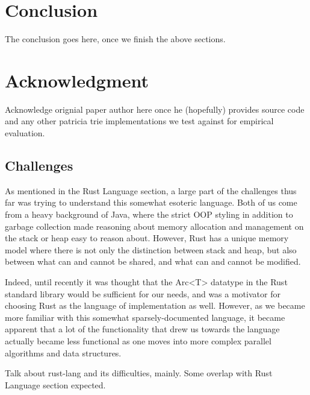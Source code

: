 \documentclass[conference]{IEEEtran}
\begin{document}
\section{Conclusion}
The conclusion goes here, once we finish the above sections.


\section{Acknowledgment}
Acknowledge orignial paper author here once he (hopefully) provides source code and any other patricia trie implementations we test against for empirical evaluation.


\appendix
\subsection{Challenges}
As mentioned in the Rust Language section, a large part of the challenges thus far was trying to understand this somewhat esoteric language. Both of us come from a heavy background of Java, where the strict OOP styling in addition to garbage collection made reasoning about memory allocation and management on the stack or heap easy to reason about. However, Rust has a unique memory model where there is not only the distinction between stack and heap, but also between what can and cannot be shared, and what can and cannot be modified.
\par
Indeed, until recently it was thought that the Arc<T> datatype in the Rust standard library would be sufficient for our needs, and was a motivator for choosing Rust as the language of implementation as well. However, as we became more familiar with this somewhat sparsely-documented language, it became apparent that a lot of the functionality that drew us towards the language actually became less functional as one moves into more complex parallel algorithms and data structures.
\par
Talk about rust-lang and its difficulties, mainly. Some overlap with Rust Language section expected.
\end{document}
